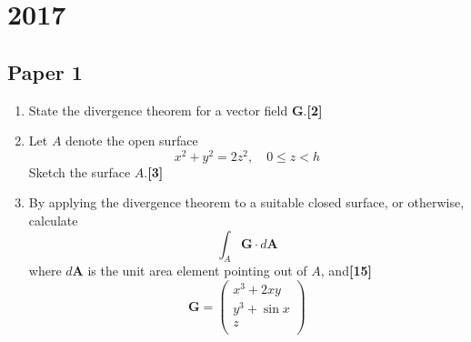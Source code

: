 \documentclass[a4paper]{article}
\begin{document}
\section{2017}
\subsection{Paper 1}
\begin{qns}\leavevmode
\begin{enumerate}[label=(\alph*)]
    \item State the divergence theorem for a vector field $\mathbf{G}$.\hfill \textbf{[2]}
    \item Let $A$ denote the open surface
$$x^2+y^2=2z^2,\quad 0\leq z<h$$
Sketch the surface $A$.\hfill \textbf{[3]}
\item  By applying the divergence theorem to a suitable closed surface, or otherwise, calculate
$$\int_A\mathbf{G}\cdot d\mathbf{A}$$
where $d\mathbf{A}$ is the unit area element pointing out of $A$, and\hfill \textbf{[15]}
$$\mathbf{G}=\begin{pmatrix}x^3+2xy\\y^3+\sin x\\z\\\end{pmatrix}$$
\end{enumerate}
\end{qns}
\end{document}
